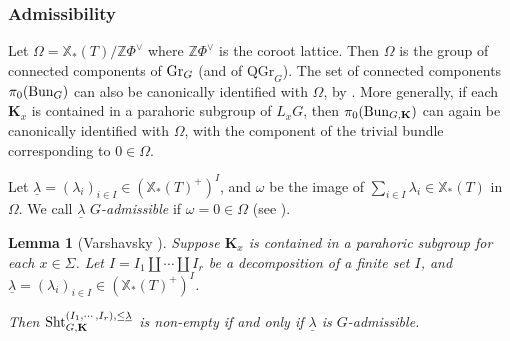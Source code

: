 \documentclass[11pt]{amsart}
\numberwithin{equation}{section}
\theoremstyle{plain}
\newtheorem{lemma}[subsubsection]{Lemma}
\theoremstyle{definition}
\def\ZZ{\mathbb{Z}}
\def\bK{\mathbf{K}}
\newcommand{\Bun}{\textup{Bun}}
\newcommand{\Gr}{\textup{Gr}}
\newcommand\Sht{\textup{Sht}}
\newcommand\xcoch{\mathbb{X}_*}
\newcommand\un{\underline}
\newcommand\sss{\subsubsection}
\newcommand{\Sig}{\Sigma}
\renewcommand{\l}{\lambda}
\newcommand{\om}{\omega}
\newcommand{\Om}{\Omega}
\newcommand{\QGr}{\mathrm{QGr}}
\begin{document}
\sss{Admissibility}
Let $\Om=\xcoch(T)/\ZZ\Phi^{\vee}$ where $\ZZ\Phi^{\vee}$ is the coroot lattice. Then $\Om$ is the group of connected components of $\Gr_{G}$ (and of $\QGr_{G}$). The set of connected components $\pi_{0}(\Bun_{G})$ can also be canonically identified with $\Om$, by \cite[Lemma 2.2]{Var}. More generally, if each $\bK_{x}$ is contained in a parahoric subgroup of $L_{x}G$, then $\pi_{0}(\Bun_{G,\bK})$ can again be canonically identified with $\Om$, with the component of the trivial bundle  corresponding to $0\in \Om$.


Let $\un\l=(\l_{i})_{i\in I}\in (\xcoch(T)^{+})^{I}$, and $\om$ be the image of $\sum_{i\in I}\l_{i}\in \xcoch(T)$ in $\Om$. We call $\un\l$ {\em $G$-admissible} if $\om=0\in \Om$ (see \cite[Definition 2.14]{Var}).

\begin{lemma}[Varshavsky {\cite[Proposition 2.16(d)]{Var}}] Suppose $\bK_{x}$ is contained in a parahoric subgroup for each $x\in \Sig$. Let $I=I_{1}\coprod\cdots\coprod I_{r}$ be a decomposition of a finite set $I$, and $\un\l=(\l_{i})_{i\in I}\in (\xcoch(T)^{+})^{I}$.

Then $\Sht^{(I_{1},\cdots, I_{r}), \le\un\l}_{G,\bK}$ is non-empty if and only if $\un\l$ is $G$-admissible.
\end{lemma}
\end{document}
